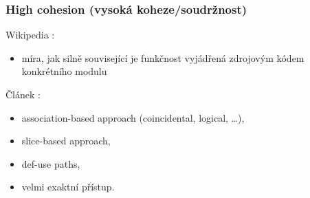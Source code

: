 


\subsubsection{High cohesion (vysoká koheze/soudržnost)}
Wikipedia \cite{wiki:cohesion}:
\begin{itemize}
\item míra, jak silně související je funkčnost vyjádřená zdrojovým kódem konkrétního modulu
\end{itemize}

\noindent{}Článek \cite{Kang:1996:DCM:872750.873361}:
\begin{itemize}
\item association-based approach (coincidental, logical, \ldots),
\item slice-based approach,
\item def-use paths,
\item velmi exaktní přístup.
\end{itemize}


